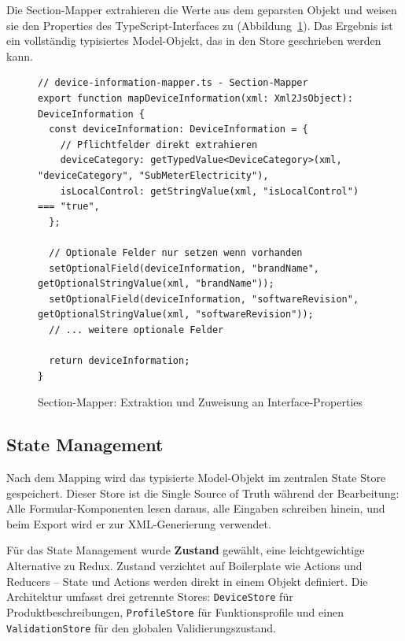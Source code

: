 \documentclass[a4paper,12pt]{article}
\newcommand{\code}[1]{\texttt{#1}}
\begin{document}
\noindent Die Section-Mapper extrahieren die Werte aus dem geparsten Objekt und weisen sie den 
Properties des TypeScript-Interfaces zu (Abbildung~\ref{fig:section-mapper}). Das Ergebnis ist 
ein vollständig typisiertes Model-Objekt, das in den Store geschrieben werden kann.

\begin{figure}[H]
    \centering
    \begin{lstlisting}[language=typescriptselective,frame=single,backgroundcolor=\color{gray!10},basicstyle=\ttfamily\scriptsize,breaklines=true]
// device-information-mapper.ts - Section-Mapper
export function mapDeviceInformation(xml: Xml2JsObject): DeviceInformation {
  const deviceInformation: DeviceInformation = {
    // Pflichtfelder direkt extrahieren
    deviceCategory: getTypedValue<DeviceCategory>(xml, "deviceCategory", "SubMeterElectricity"),
    isLocalControl: getStringValue(xml, "isLocalControl") === "true",
  };

  // Optionale Felder nur setzen wenn vorhanden
  setOptionalField(deviceInformation, "brandName", getOptionalStringValue(xml, "brandName"));
  setOptionalField(deviceInformation, "softwareRevision", getOptionalStringValue(xml, "softwareRevision"));
  // ... weitere optionale Felder

  return deviceInformation;
}
    \end{lstlisting}
    \caption{Section-Mapper: Extraktion und Zuweisung an Interface-Properties}
    \label{fig:section-mapper}
\end{figure}

\newpage

\subsection{State Management}
\label{sec:state-management}

Nach dem Mapping wird das typisierte Model-Objekt im zentralen State Store gespeichert. Dieser Store ist 
die Single Source of Truth während der Bearbeitung: Alle Formular-Komponenten lesen daraus, alle Eingaben 
schreiben hinein, und beim Export wird er zur XML-Generierung verwendet.

Für das State Management wurde \textbf{Zustand} gewählt, eine leichtgewichtige Alternative zu Redux. Zustand 
verzichtet auf Boilerplate wie Actions und Reducers -- State und Actions werden direkt in einem Objekt 
definiert. Die Architektur umfasst drei getrennte Stores: \code{DeviceStore} für Produktbeschreibungen, 
\code{ProfileStore} für Funktionsprofile und einen \code{ValidationStore} für den globalen Validierungszustand.
\end{document}
